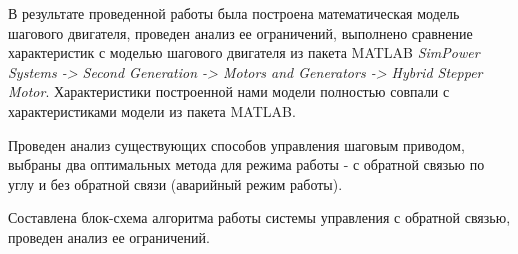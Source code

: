 \documentclass{article}
\begin{document}
В результате проведенной работы была построена математическая модель шагового двигателя, проведен
анализ ее ограничений, выполнено сравнение характеристик с моделью шагового двигателя из пакета MATLAB
\textit{SimPower Systems -> Second Generation -> Motors and Generators -> Hybrid Stepper Motor}.
Характеристики построенной нами модели полностью совпали с характеристиками модели из пакета MATLAB.

Проведен анализ существующих способов управления шаговым приводом, выбраны два оптимальных метода для
режима работы - с обратной связью по углу и без обратной связи (аварийный режим работы).

Составлена блок-схема алгоритма работы системы управления с обратной связью, проведен анализ ее
ограничений.


\end{document}
